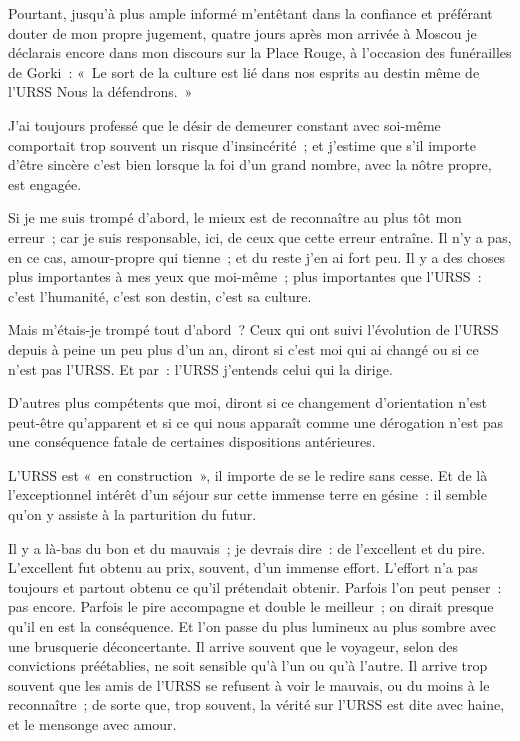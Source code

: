 \documentclass[french,twoside]{book} %
\begin{document}
\noindent Pourtant, jusqu’à plus ample informé m’entêtant dans la confiance et préférant douter de mon propre jugement, quatre jours après mon arrivée à Moscou je déclarais encore dans mon discours sur la Place Rouge, à l’occasion des funérailles de Gorki : « Le sort de la culture est lié dans nos esprits au destin même de l’URSS Nous la défendrons. »\par
J’ai toujours professé que le désir de demeurer constant avec soi-même comportait trop souvent un risque d’insincérité ; et j’estime que s’il importe d’être sincère c’est bien lorsque la foi d’un grand nombre, avec la nôtre propre, est engagée.\par
Si je me suis trompé d’abord, le mieux est de reconnaître au plus tôt mon erreur ; car je suis responsable, ici, de ceux que cette erreur entraîne. Il n’y a pas, en ce cas, amour-propre qui tienne ; et du reste j’en ai fort peu. Il y a des choses plus importantes à mes yeux que moi-même ; plus importantes que l’URSS : c’est l’humanité, c’est son destin, c’est sa culture.\par
Mais m’étais-je trompé tout d’abord ? Ceux qui ont suivi l’évolution de l’URSS depuis à peine un peu plus d’un an, diront si c’est moi qui ai changé ou si ce n’est pas l’URSS. Et par : l’URSS j’entends celui qui la dirige.\par
D’autres plus compétents que moi, diront si ce changement d’orientation n’est peut-être qu’apparent et si ce qui nous apparaît comme une dérogation n’est pas une conséquence fatale de certaines dispositions antérieures.\par
L’URSS est « en construction », il importe de se le redire sans cesse. Et de là l’exceptionnel intérêt d’un séjour sur cette immense terre en gésine : il semble qu’on y assiste à la parturition du futur.\par
Il y a là-bas du bon et du mauvais ; je devrais dire : de l’excellent et du pire. L’excellent fut obtenu au prix, souvent, d’un immense effort. L’effort n’a pas toujours et partout obtenu ce qu’il prétendait obtenir. Parfois l’on peut penser : pas encore. Parfois le pire accompagne et double le meilleur ; on dirait presque qu’il en est la conséquence. Et l’on passe du plus lumineux au plus sombre avec une brusquerie déconcertante. Il arrive souvent que le voyageur, selon des convictions préétablies, ne soit sensible qu’à l’un ou qu’à l’autre. Il arrive trop souvent que les amis de l’URSS se refusent à voir le mauvais, ou du moins à le reconnaître ; de sorte que, trop souvent, la vérité sur l’URSS est dite avec haine, et le mensonge avec amour.\par
\end{document}
